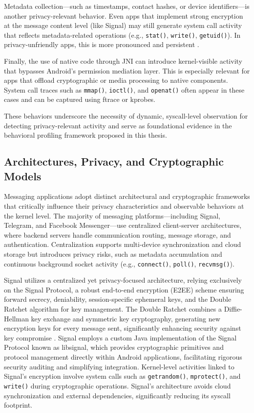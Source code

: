 \documentclass[a4paper,12pt]{report}
\begin{document}
Metadata collection—such as timestamps, contact hashes, or device identifiers—is another privacy-relevant behavior. Even apps that implement strong encryption at the message content level (like Signal) may still generate system call activity that reflects metadata-related operations (e.g., \texttt{stat()}, \texttt{write()}, \texttt{getuid()}). In privacy-unfriendly apps, this is more pronounced and persistent \cite{signalprivacy2016}.

Finally, the use of native code through JNI can introduce kernel-visible activity that bypasses Android’s permission mediation layer. This is especially relevant for apps that offload cryptographic or media processing to native components. System call traces such as \texttt{mmap()}, \texttt{ioctl()}, and \texttt{openat()} often appear in these cases and can be captured using ftrace or kprobes.

These behaviors underscore the necessity of dynamic, syscall-level observation for detecting privacy-relevant activity and serve as foundational evidence in the behavioral profiling framework proposed in this thesis.

\subsection{Architectures, Privacy, and Cryptographic Models}
Messaging applications adopt distinct architectural and cryptographic frameworks that critically influence their privacy characteristics and observable behaviors at the kernel level. The majority of messaging platforms—including Signal, Telegram, and Facebook Messenger—use centralized client-server architectures, where backend servers handle communication routing, message storage, and authentication. Centralization supports multi-device synchronization and cloud storage but introduces privacy risks, such as metadata accumulation and continuous background socket activity (e.g., \texttt{connect()}, \texttt{poll()}, \texttt{recvmsg()}).

Signal utilizes a centralized yet privacy-focused architecture, relying exclusively on the Signal Protocol, a robust end-to-end encryption (E2EE) scheme ensuring forward secrecy, deniability, session-specific ephemeral keys, and the Double Ratchet algorithm for key management. The Double Ratchet combines a Diffie-Hellman key exchange and symmetric key cryptography, generating new encryption keys for every message sent, significantly enhancing security against key compromise \cite{signalwhitepaper}. Signal employs a custom Java implementation of the Signal Protocol known as libsignal, which provides cryptographic primitives and protocol management directly within Android applications, facilitating rigorous security auditing and simplifying integration. Kernel-level activities linked to Signal’s encryption involve system calls such as \texttt{getrandom()}, \texttt{mprotect()}, and \texttt{write()} during cryptographic operations. Signal's architecture avoids cloud synchronization and external dependencies, significantly reducing its syscall footprint.
\end{document}
